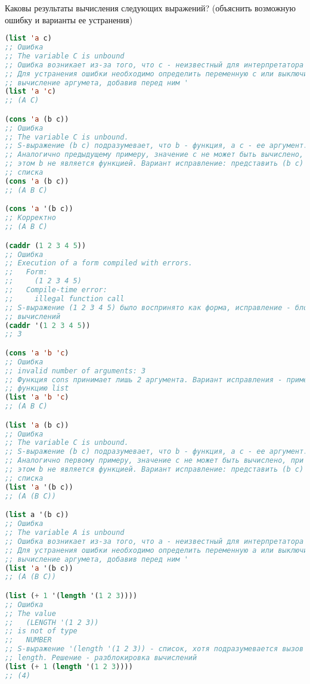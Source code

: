Каковы результаты вычисления следующих выражений? (объяснить возможную ошибку и
варианты ее устранения)

\begin{lstlisting}[language=Lisp]
(list 'a c)
;; Ошибка
;; The variable C is unbound
;; Ошибка возникает из-за того, что c - неизвестный для интерпретатора атом.
;; Для устранения ошибки необходимо определить переменную c или выключить
;; вычисление аргумета, добавив перед ним '
(list 'a 'c)
;; (A C)

(cons 'a (b c))
;; Ошибка
;; The variable C is unbound.
;; S-выражение (b c) подразумевает, что b - функция, a с - ее аргумент.
;; Аналогично предыдущему примеру, значение c не может быть вычислено, при
;; этом b не является функцией. Вариант исправление: представить (b c) в виде
;; списка
(cons 'a (b c))
;; (A B C)

(cons 'a '(b c))
;; Корректно
;; (A B C)

(caddr (1 2 3 4 5))
;; Ошибка
;; Execution of a form compiled with errors.
;;   Form:
;;     (1 2 3 4 5)
;;   Compile-time error:
;;     illegal function call
;; S-выражение (1 2 3 4 5) было воспринято как форма, исправление - блокировка
;; вычислений
(caddr '(1 2 3 4 5))
;; 3

(cons 'a 'b 'c)
;; Ошибка
;; invalid number of arguments: 3
;; Функция cons принимает лишь 2 аргумента. Вариант исправления - применить
;; функцию list
(list 'a 'b 'c)
;; (A B C)

(list 'a (b c))
;; Ошибка
;; The variable C is unbound.
;; S-выражение (b c) подразумевает, что b - функция, a с - ее аргумент.
;; Аналогично первому примеру, значение c не может быть вычислено, при
;; этом b не является функцией. Вариант исправление: представить (b c) в виде
;; списка
(list 'a '(b c))
;; (A (B C))

(list a '(b c))
;; Ошибка
;; The variable A is unbound
;; Ошибка возникает из-за того, что a - неизвестный для интерпретатора атом.
;; Для устранения ошибки необходимо определить переменную a или выключить
;; вычисление аргумета, добавив перед ним '
(list 'a '(b c))
;; (A (B C))

(list (+ 1 '(length '(1 2 3))))
;; Ошибка
;; The value
;;   (LENGTH '(1 2 3))
;; is not of type
;;   NUMBER
;; S-выражение '(length '(1 2 3)) - список, хотя подразумевается вызов функции
;; length. Решение - разблокировка вычислений
(list (+ 1 (length '(1 2 3))))
;; (4)
\end{lstlisting}

